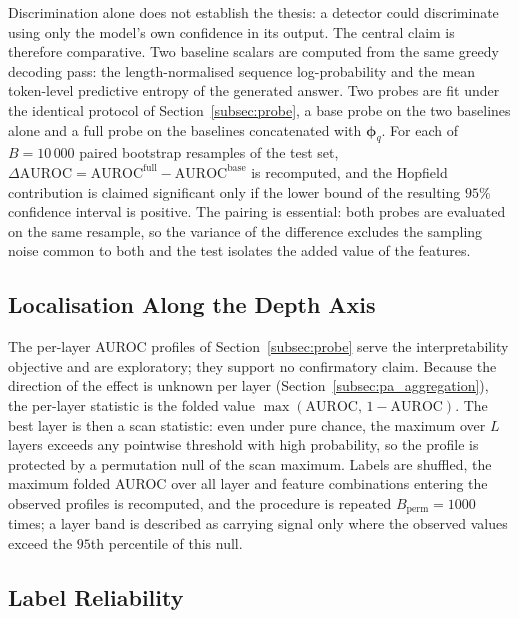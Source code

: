 Discrimination alone does not establish the thesis: a detector could
discriminate using only the model's own confidence in its output. The
central claim is therefore comparative. Two baseline scalars are computed
from the same greedy decoding pass: the length-normalised sequence
log-probability and the mean token-level predictive entropy of the
generated answer. Two probes are fit under the identical protocol of
Section~\ref{subsec:probe}, a base probe on the two baselines alone and a
full probe on the baselines concatenated with $\boldsymbol{\phi}_q$. For
each of $B = 10\,000$ paired bootstrap resamples of the test set,
$\Delta\mathrm{AUROC} = \mathrm{AUROC}^{\mathrm{full}} -
\mathrm{AUROC}^{\mathrm{base}}$ is recomputed, and the Hopfield
contribution is claimed significant only if the lower bound of the
resulting $95\%$ confidence interval is positive. The pairing is essential:
both probes are evaluated on the same resample, so the variance of the
difference excludes the sampling noise common to both and the test isolates
the added value of the features.

\subsection{Localisation Along the Depth Axis}
\label{subsec:an_localisation}

The per-layer AUROC profiles of Section~\ref{subsec:probe} serve the
interpretability objective and are exploratory; they support no
confirmatory claim. Because the direction of the effect is unknown per
layer (Section~\ref{subsec:pa_aggregation}), the per-layer statistic is the
folded value $\max(\mathrm{AUROC},\,1-\mathrm{AUROC})$. The best layer is
then a scan statistic: even under pure chance, the maximum over $L$ layers
exceeds any pointwise threshold with high probability, so the profile is
protected by a permutation null of the scan maximum. Labels are shuffled,
the maximum folded AUROC over all layer and feature combinations entering
the observed profiles is recomputed, and the procedure is
repeated $B_{\mathrm{perm}} = 1000$ times; a layer band is described as
carrying signal only where the observed values exceed the $95$th percentile
of this null.

\subsection{Label Reliability}
\label{subsec:an_label_reliability}

